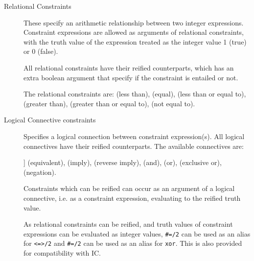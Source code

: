 \begin{description}
\item[Relational Constraints]
These specify an arithmetic relationship between two integer expressions.
Constraint expressions are allowed as arguments of relational constraints,
with the truth value of the expression treated as the integer value 1 (true)
or 0 (false).

All relational constraints have their reified counterparts, which has an extra
boolean argument that specify if the constraint is entailed or not.

The  relational constraints are:
 (less than),
 (equal), 
 (less than or equal to),
 (greater than),
 (greater than or equal to),
 (not equal to).

\item[Logical Connective constraints]
Specifies a logical connection between  constraint expression(s). 
All logical connectives have their reified counterparts.
The available connectives are:

] (equivalent),
 (imply),
 (reverse imply),
 (and),
 (or),
 (exclusive or),
 (negation).

Constraints
which can be reified can occur as an argument of a logical connective, i.e.
as a constraint expression, evaluating to the reified truth value.

As relational constraints can be reified, and truth values of constraint
expressions can be evaluated as integer values, \texttt{\#=/2} can be used
as an alias for \texttt{<=>/2} and \texttt{\#\bsl=/2} can be used as an 
alias for \texttt{xor}. This is also provided for compatibility with IC.


\end{description}

